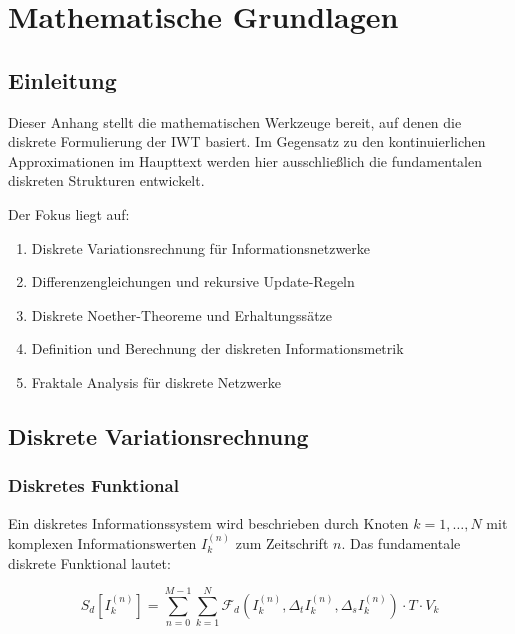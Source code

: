 
\chapter{Mathematische Grundlagen}
\label{app:mathematik}

\section{Einleitung}
\label{app:mathematik_einleitung}

Dieser Anhang stellt die mathematischen Werkzeuge bereit, auf denen die diskrete Formulierung der IWT basiert. Im Gegensatz zu den kontinuierlichen Approximationen im Haupttext werden hier ausschließlich die fundamentalen diskreten Strukturen entwickelt.

Der Fokus liegt auf:

\begin{enumerate}
    \item Diskrete Variationsrechnung für Informationsnetzwerke
    \item Differenzengleichungen und rekursive Update-Regeln
    \item Diskrete Noether-Theoreme und Erhaltungssätze
    \item Definition und Berechnung der diskreten Informationsmetrik
    \item Fraktale Analysis für diskrete Netzwerke
\end{enumerate}

\section{Diskrete Variationsrechnung}
\label{app:mathematik_varrechnung}

\subsection{Diskretes Funktional}
\label{sub:mathematik_funktional}

Ein diskretes Informationssystem wird beschrieben durch Knoten \( k = 1, \dots, N \) mit komplexen Informationswerten \( I_k^{(n)} \) zum Zeitschrift \( n \). Das fundamentale diskrete Funktional lautet:

\[
S_d \left[ I_k^{(n)} \right] = \sum_{n=0}^{M-1} \sum_{k=1}^{N} \mathcal{F}_d \left( I_k^{(n)}, \Delta_t I_k^{(n)}, \Delta_s I_k^{(n)} \right) \cdot T \cdot V_k
\]

